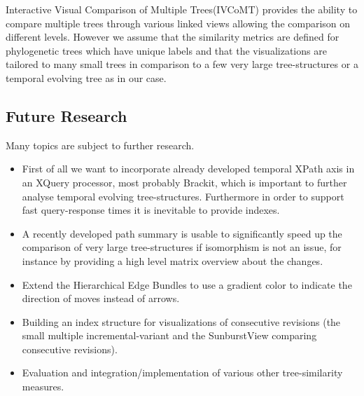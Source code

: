 
Interactive Visual Comparison of Multiple Trees(IVCoMT\cite{bremm2011interactive}) provides the ability to compare multiple trees through various linked views allowing the comparison on different levels. However we assume that the similarity metrics are defined for phylogenetic trees which have unique labels and that the visualizations are tailored to many small trees in comparison to a few very large tree-structures or a temporal evolving tree as in our case.

\subsection{Future Research}
Many topics are subject to further research. 

\begin{itemize}
\item First of all we want to incorporate already developed temporal XPath axis in an XQuery processor, most probably Brackit\cite{Brackit}, which is important to further analyse temporal evolving tree-structures. Furthermore in order to support fast query-response times it is inevitable to provide indexes. 
\item A recently developed path summary is usable to significantly speed up the comparison of very large tree-structures if isomorphism is not an issue, for instance by providing a high level matrix overview about the changes. 
\item Extend the Hierarchical Edge Bundles to use a gradient color to indicate the direction of moves instead of arrows.
\item Building an index structure for visualizations of consecutive revisions (the small multiple incremental-variant and the SunburstView comparing consecutive revisions).
\item Evaluation and integration/implementation of various other tree-similarity measures.
\end{itemize} 
